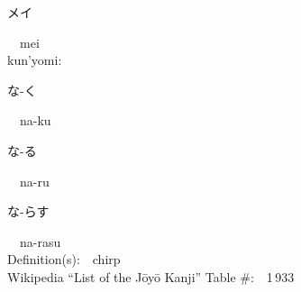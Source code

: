 \begin{multicols}{2}
{\hspace*{2em}}{\begin{CJK}{UTF8}{min} メイ \end{CJK}}\ \ mei\ \ \\
{\hspace*{1em}}kun'yomi:\ \ \\
{\hspace*{2em}}{\begin{CJK}{UTF8}{min} な-く \end{CJK}}\ \ na-ku\ \ \\
{\hspace*{2em}}{\begin{CJK}{UTF8}{min} な-る \end{CJK}}\ \ na-ru\ \ \\
{\hspace*{2em}}{\begin{CJK}{UTF8}{min} な-らす \end{CJK}}\ \ na-rasu\ \ \\
Definition(s):\ \ chirp \\
Wikipedia ``List of the J\=oy\=o Kanji'' Table \#:\ \ 1\,933 \\
\ \ \\
\end{multicols}



